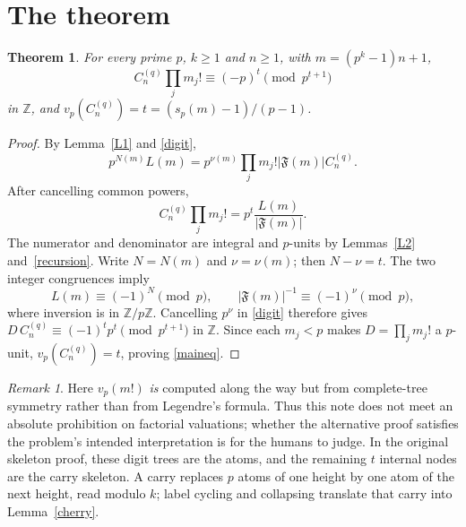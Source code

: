 \documentclass[10pt]{article}
\newtheorem{theorem}{Theorem}
\theoremstyle{definition}\newtheorem*{definition}{Definition}
\theoremstyle{remark}\newtheorem*{remark}{Remark}
\newcommand{\F}{\mathfrak F}
\begin{document}
\section{The theorem}
\begin{theorem}\label{main} For every prime $p$, $k\ge1$ and $n\ge1$,
with $m=(p^k-1)n+1$,
\begin{equation}\label{maineq}
 \boxed{C_n^{(q)}\prod_jm_j!\equiv(-p)^t\pmod{p^{t+1}}}
\end{equation}
in $\mathbb Z$, and $v_p(C_n^{(q)})=t=(s_p(m)-1)/(p-1)$.\end{theorem}
\begin{proof} By Lemma~\ref{L1} and \eqref{digit},
\[
 p^{N(m)}L(m)=p^{\nu(m)}\prod_jm_j!|\F(m)|C_n^{(q)}.
\]
After cancelling common powers,
\[
 C_n^{(q)}\prod_jm_j!=p^t\frac{L(m)}{|\F(m)|}.
\]
The numerator and denominator are integral and $p$-units by
Lemmas~\ref{L2} and~\ref{recursion}. Write $N=N(m)$ and $\nu=\nu(m)$;
then $N-\nu=t$. The two integer congruences imply
\[
 L(m)\equiv(-1)^N\pmod p,\qquad |\F(m)|^{-1}\equiv(-1)^\nu\pmod p,
\]
where inversion is in $\mathbb Z/p\mathbb Z$. Cancelling $p^\nu$ in
\eqref{digit} therefore gives $D\,C_n^{(q)}\equiv(-1)^t p^t\pmod{p^{t+1}}$
in $\mathbb Z$. Since each $m_j<p$ makes $D=\prod_jm_j!$ a $p$-unit,
$v_p(C_n^{(q)})=t$, proving \eqref{maineq}.\end{proof}
\begin{remark}\label{qualification} Here $v_p(m!)$ \emph{is} computed along the
way but from complete-tree symmetry rather than from Legendre's formula. Thus
this note does not meet an absolute prohibition on factorial valuations; whether
the alternative proof satisfies the problem's intended interpretation is for
the humans to judge. In the original skeleton proof, these digit trees are the
atoms, and the remaining $t$ internal nodes are the carry skeleton. A carry
replaces $p$ atoms of one height by one atom of the next height, read modulo
$k$; label cycling and collapsing translate that carry into Lemma~\ref{cherry}.\end{remark}
\end{document}
